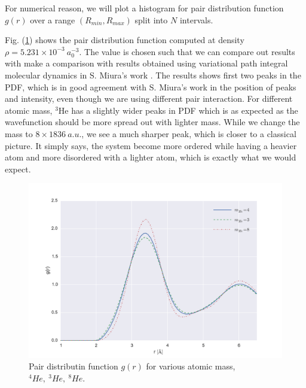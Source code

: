\documentclass[11pt,letter,nocenter]{revtex4-1}
\begin{document}
 
For numerical reason, we will plot a histogram for pair distribution function $g(r)$ over a range $(R_{min}, R_{max})$ split into $N$ intervals. 
%

Fig. (\ref{fig:pdf}) shows the pair distribution function computed at density $\rho = 5.231 \times 10^{-3}~a_0^{-3}$. The value is chosen such that we can compare out results with make a comparison with results obtained using variational path integral molecular dynamics in S. Miura's work \cite{Miura2011}.
The results shows first two peaks in the PDF, which is in good agreement with S. Miura's work in the position of peaks and intensity, even though we are using different pair interaction.
For different atomic mass, $^3$He has a slightly wider peaks in PDF which is as expected as the wavefunction should be more spread out with lighter mass. While we change the mass to $ 8 \times 1836 ~a.u.$, we see a much sharper peak, which is closer to a classical picture. It simply says, the system become more ordered while having a heavier atom and more disordered with a lighter atom, which is exactly what we would expect.  

 \begin{figure}
  \includegraphics[width = \textwidth]{figs/pdf.pdf}
  \caption{Pair distributin function $g(r)$ for various atomic mass, $^4He,~^3He,~^8He$.}
  \label{fig:pdf}
\end{figure}
\end{document}
